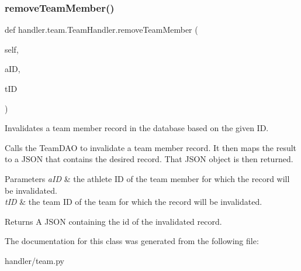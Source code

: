 \subsubsection{\texorpdfstring{remove\+Team\+Member()}{removeTeamMember()}}
{\footnotesize\ttfamily def handler.\+team.\+Team\+Handler.\+remove\+Team\+Member (\begin{DoxyParamCaption}\item[{}]{self,  }\item[{}]{a\+ID,  }\item[{}]{t\+ID }\end{DoxyParamCaption})}



Invalidates a team member record in the database based on the given ID. 

Calls the Team\+D\+AO to invalidate a team member record. It then maps the result to a J\+S\+ON that contains the desired record. That J\+S\+ON object is then returned.


\begin{DoxyParams}{Parameters}
{\em a\+ID} & the athlete ID of the team member for which the record will be invalidated. \\
\hline
{\em t\+ID} & the team ID of the team for which the record will be invalidated.\\
\hline
\end{DoxyParams}
\begin{DoxyReturn}{Returns}
A J\+S\+ON containing the id of the invalidated record. 
\end{DoxyReturn}


The documentation for this class was generated from the following file\+:\begin{DoxyCompactItemize}
\item 
handler/team.\+py\end{DoxyCompactItemize}
